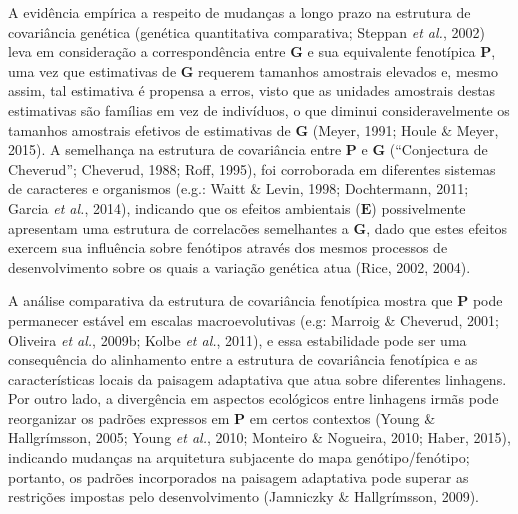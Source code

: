 \documentclass[12pt,twoside]{report}
\begin{document}
A evidência empírica a respeito de mudanças a longo prazo na estrutura
de covariância genética (genética quantitativa comparativa; Steppan
\emph{et al.}, 2002) leva em consideração a correspondência entre
$\mathbf{G}$ e sua equivalente fenotípica $\mathbf{P}$, uma vez que
estimativas de $\mathbf{G}$ requerem tamanhos amostrais elevados e,
mesmo assim, tal estimativa é propensa a erros, visto que as unidades
amostrais destas estimativas são famílias em vez de indivíduos, o que
diminui consideravelmente os tamanhos amostrais efetivos de estimativas
de $\mathbf{G}$ (Meyer, 1991; Houle \& Meyer, 2015). A semelhança na
estrutura de covariância entre $\mathbf{P}$ e $\mathbf{G}$ (``Conjectura
de Cheverud''; Cheverud, 1988; Roff, 1995), foi corroborada em
diferentes sistemas de caracteres e organismos (e.g.: Waitt \& Levin,
1998; Dochtermann, 2011; Garcia \emph{et al.}, 2014), indicando que os
efeitos ambientais ($\mathbf{E}$) possivelmente apresentam uma estrutura
de correlacões semelhantes a $\mathbf{G}$, dado que estes efeitos
exercem sua influência sobre fenótipos através dos mesmos processos de
desenvolvimento sobre os quais a variação genética atua (Rice, 2002,
2004).

A análise comparativa da estrutura de covariância fenotípica mostra que
$\mathbf{P}$ pode permanecer estável em escalas macroevolutivas (e.g:
Marroig \& Cheverud, 2001; Oliveira \emph{et al.}, 2009b; Kolbe \emph{et
al.}, 2011), e essa estabilidade pode ser uma consequência do
alinhamento entre a estrutura de covariância fenotípica e as
características locais da paisagem adaptativa que atua sobre diferentes
linhagens. Por outro lado, a divergência em aspectos ecológicos entre
linhagens irmãs pode reorganizar os padrões expressos em $\mathbf{P}$ em
certos contextos (Young \& Hallgrímsson, 2005; Young \emph{et al.},
2010; Monteiro \& Nogueira, 2010; Haber, 2015), indicando mudanças na
arquitetura subjacente do mapa genótipo/fenótipo; portanto, os padrões
incorporados na paisagem adaptativa pode superar as restrições impostas
pelo desenvolvimento (Jamniczky \& Hallgrímsson, 2009).
\end{document}
